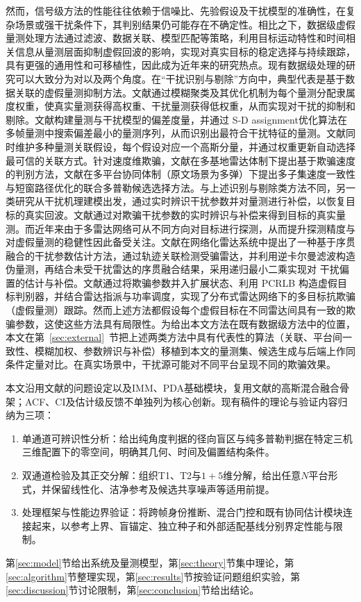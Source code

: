 \documentclass[UTF8,a4paper,zihao=-4]{ctexart}
\newcommand{\ul}[1]{\CJKunderline{#1}}
\begin{document}
然而，信号级方法的性能往往依赖于信噪比、先验假设及干扰模型的准确性，在复杂场景或强干扰条件下，其判别结果仍可能存在不确定性。相比之下，数据级虚假量测处理方法通过滤波、数据关联、模型匹配等策略，利用目标运动特性和时间相关信息从量测层面抑制虚假回波的影响，实现对真实目标的稳定选择与持续跟踪，具有更强的通用性和可移植性，因此成为近年来的研究热点。现有数据级处理的研究可以大致分为对\ul{干扰的识别和剔除}以及\ul{干扰参数的辨识和补偿}两个角度。在``干扰识别与剔除''方向中，典型代表是基于数据关联的虚假量测抑制方法。文献\cite{rough2018}通过模糊聚类及其优化机制为每个量测分配隶属度权重，使真实量测获得高权重、干扰量测获得低权重，从而实现对干扰的抑制和剔除。文献\cite{zhang2025}构建量测与干扰模型的偏差度量，并通过 S‑D
assignment优化算法在多帧量测中搜索偏差最小的量测序列，从而识别出最符合干扰特征的量测。文献\cite{calatrava2025}同时维护多种量测关联假设，每个假设对应一个高斯分量，并通过权重更新自动选择最可信的关联方式。针对速度维欺骗，文献\cite{li2024}在多基地雷达体制下提出基于欺骗速度的判别方法，文献\cite{renVG2026}在多平台协同体制（原文场景为多弹）下提出多子集速度一致性与短窗路径优化的联合多普勒候选选择方法。与上述识别与剔除类方法不同，另一类研究从干扰机理建模出发，通过实时辨识干扰参数并对量测进行补偿，以恢复目标的真实回波。文献\cite{zhao2024}通过对欺骗干扰参数的实时辨识与补偿来得到目标的真实量测。而近年来由于多雷达网络可从不同方向对目标进行探测，从而提升探测精度与对虚假量测的稳健性因此备受关注。文献\cite{lingadevaru2022}在网络化雷达系统中提出了一种基于序贯融合的干扰参数估计方法，通过轨迹关联检测受骗雷达，并利用逆卡尔曼滤波构造伪量测，再结合未受干扰雷达的序贯融合结果，采用递归最小二乘实现对
干扰偏置的估计与补偿。文献\cite{sun2024}通过将欺骗参数并入扩展状态、利用
PCRLB
构造虚假目标判别器，并结合雷达指派与功率调度，实现了分布式雷达网络下的多目标抗欺骗（虚假量测）跟踪。然而上述方法都假设每个虚假目标在不同雷达间具有一致的欺骗参数，这使这些方法具有局限性。为给出本文方法在既有数据级方法中的位置，本文在第~\ref{sec:external}~节把上述两类方法中具有代表性的算法（关联、平台间一致性、模糊加权、参数辨识与补偿）移植到本文的量测集、候选生成与后端上作同条件定量对比。在真实场景中，干扰源可能对不同平台呈现不同的欺骗效果。




本文沿用文献\cite{ma2026}的问题设定以及IMM、PDA基础模块，复用文献\cite{ren2026}的高斯混合融合骨架；ACF、CI及估计级反馈不单独列为核心创新。现有稿件的理论与验证内容归纳为三项：
\begin{enumerate}
\item 单通道可辨识性分析：给出纯角度判据的径向盲区与纯多普勒判据在特定三机三维配置下的零空间，明确其几何、时间及偏置结构条件。
\item 双通道检验及其正交分解：组织T1、T2与\(1+5\)维分解，给出任意\(N\)平台形式，并保留线性化、洁净参考及候选共享噪声等适用前提。
\item 处理框架与性能边界验证：将跨帧身份推断、混合门控和既有协同估计模块连接起来，以参考上界、盲锚定、独立种子和外部适配基线分别界定性能与限制。
\end{enumerate}
第\ref{sec:model}节给出系统及量测模型，第\ref{sec:theory}节集中理论，第\ref{sec:algorithm}节整理实现，第\ref{sec:results}节按验证问题组织实验，第\ref{sec:discussion}节讨论限制，第\ref{sec:conclusion}节给出结论。
\end{document}
